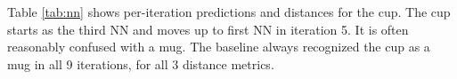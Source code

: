 \documentclass[letterpaper, 10 pt, conference]{ieeeconf}  %
\begin{document}
\begin{comment}
\begin{figure}[thbp]
  \begin{center}
    \texttt{[image: imgs/dist\_vs\_iter\_mug]}
  \end{center}
  \caption{Distance (y) to true class \textit{vs.} iterations (x), for different simulation settings for mug. Each curve is a simulation setting. Error bars are mean and variance in distances to all objects. Dots and crosses are hits and misses.}
  \label{fig:dist_vs_iter}
\end{figure}


\begin{figure}[thbp]
  \begin{center}
    \texttt{[image: imgs/rewards\_mug\_150sims\_2016-09-12-04-29-19.eps]}
  \end{center}
  \caption{Rewards (y) over time for mug; similar for all objects. x-axis is number of simulations within a tree. Each curve is a iteration. Rewards diminish over iterations as unvisited poses are exhausted.}
  \label{fig:rewards}
\end{figure}
\end{comment}


Table \ref{tab:nn} shows per-iteration predictions and distances for the cup. The cup starts as the third NN and moves up to first NN in iteration 5. It is often reasonably confused with a mug. The baseline always recognized the cup as a mug in all 9 iterations, for all 3 distance metrics.
\end{document}
